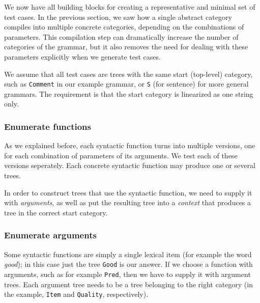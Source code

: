 \documentclass[runningheads]{llncs}
\def\t#1{\texttt{#1}}
\begin{document}
We now have all building blocks for creating a representative and
minimal set of test cases.
In the previous section, we saw how a single abstract category
compiles into multiple concrete categories, depending on the
combinations of parameters. This compilation step can dramatically
increase the number of categories of the grammar, but it also removes
the need for dealing with these parameters explicitly when we generate
test cases. 



We assume that all test cases are trees with the same start
(top-level) category, such as \t{Comment} in our example grammar, or \t{S}
(for sentence) for more general grammars. The requirement is that the
start category is linearized as one string only. 

\subsubsection{Enumerate functions} As we explained before, each syntactic
function turns into multiple versions, one for each combination of
parameters of its arguments. We test each of these versions
seperately. Each concrete syntactic function may produce one or several trees.

In order to construct trees that use the syntactic function, we need
to supply it with \emph{arguments}, as well as put the resulting tree
into a \emph{context} that produces a tree in the correct start
category.

\subsubsection{Enumerate arguments} Some syntactic functions are simply a single lexical item (for example the word \emph{good}); in this case just the tree \t{Good} is our answer. If we choose a function with arguments, such as for example \t{Pred}, then we have to supply it with argument trees. Each argument tree needs to be a tree belonging to the right category (in the example, \t{Item} and \t{Quality}, respectively).
\end{document}
